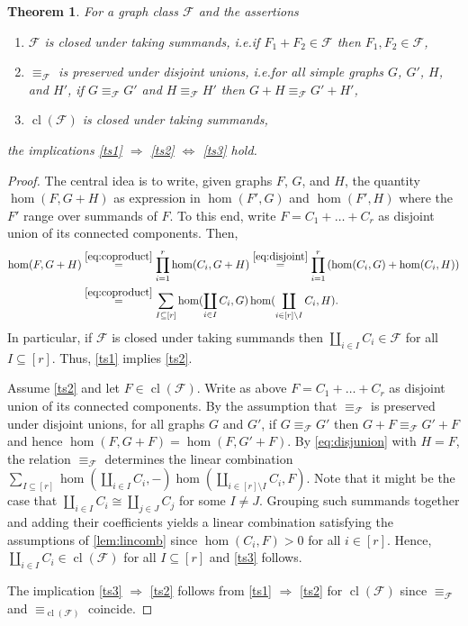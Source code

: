 \documentclass[3p,final]{elsarticle}
\DeclareMathOperator{\cl}{cl}
\newtheorem{theorem}{Theorem}
\begin{document}
	\begin{theorem}  \label{thm:taking-summands}
		For a graph class $\mathcal{F}$ and the assertions
		\begin{enumerate}
			\item $\mathcal{F}$ is \emph{closed under taking summands}, i.e.\@ if $F_1 + F_2 \in \mathcal{F}$ then $F_1, F_2 \in \mathcal{F}$,\label{ts1}
			\item $\equiv_{\mathcal{F}}$ is \emph{preserved under disjoint unions}, i.e.\@ for all simple graphs $G$, $G'$, $H$, and $H'$, if $G \equiv_{\mathcal{F}} G'$ and $H \equiv_{\mathcal{F}} H'$ then $G + H \equiv_{\mathcal{F}} G' + H'$,\label{ts2}
			\item $\cl(\mathcal{F})$ is closed under taking summands,\label{ts3}
		\end{enumerate}
		the implications \ref{ts1} $\Rightarrow$ \ref{ts2} $\Leftrightarrow$ \ref{ts3} hold.
	\end{theorem}
	\begin{proof}
		The central idea is to write, given graphs $F$, $G$, and $H$, the quantity $\hom(F, G + H)$ as expression in $\hom(F', G)$ and $\hom(F', H)$ where the $F'$ range over summands of $F$.
		To this end, write $F = C_1 + \dots + C_r$ as disjoint union of its connected components. Then,
		\begin{align}
			\hom(F, G + H) 
			&\overset{\eqref{eq:coproduct}}{=} \prod_{i=1}^r \hom(C_i, G + H) \notag
			\overset{\eqref{eq:disjoint}}{=} \prod_{i=1}^r \left( \hom(C_i, G) + \hom(C_i, H) \right) \notag \\
			&\overset{\eqref{eq:coproduct}}{=} \sum_{I \subseteq [r]} \hom(\coprod_{i \in I} C_i, G) \hom(\coprod_{i \in [r] \setminus I} C_i, H). \label{eq:disjunion}
		\end{align}
		In particular, if $\mathcal{F}$ is closed under taking summands 
		then $\coprod_{i \in I} C_i \in \mathcal{F}$ for all $I \subseteq [r]$.
		Thus, \ref{ts1} implies \ref{ts2}.
		
		Assume \ref{ts2} and let $F \in \cl(\mathcal{F})$. Write as above $F = C_1 + \dots + C_r$ as disjoint union of its connected components.
		By the assumption that $\equiv_{\mathcal{F}}$ is preserved under disjoint unions, for all graphs $G$ and $G'$, if $G \equiv_{\mathcal{F}} G'$ then $G + F \equiv_{\mathcal{F}} G' + F$ and hence $\hom(F, G+F) = \hom(F, G' + F)$.
		By \cref{eq:disjunion} with $H = F$, 
		the relation $\equiv_{\mathcal{F}}$ determines the linear combination $\sum_{I \subseteq [r]} \hom(\coprod_{i \in I} C_i, -) \hom(\coprod_{i \in [r] \setminus I} C_i, F)$. 
		Note that it might be the case that $\coprod_{i \in I} C_i \cong \coprod_{j \in J} C_j$ for some $I \neq J$.
		Grouping such summands together and adding their coefficients yields a linear combination satisfying the assumptions of \cref{lem:lincomb} since $\hom(C_i, F) > 0$ for all $i \in [r]$. Hence, $\coprod_{i \in I} C_i \in \cl(\mathcal{F})$ for all $I \subseteq [r]$ and \ref{ts3} follows.
		
		
		The implication \ref{ts3} $\Rightarrow$ \ref{ts2} follows from \ref{ts1} $\Rightarrow$ \ref{ts2} for $\cl(\mathcal{F})$ since $\equiv_{\mathcal{F}}$ and $\equiv_{\cl(\mathcal{F})}$ coincide.
	\end{proof}
\end{document}
